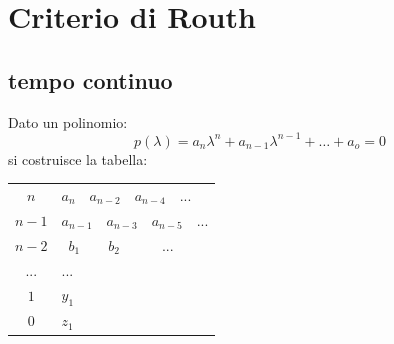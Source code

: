 \documentclass{report}
\theoremstyle{nostyle}
\begin{document}
\section{Criterio di Routh}
\subsection*{tempo continuo}
Dato un polinomio:
$$p(\lambda) = a_n\lambda^n + a_{n-1} \lambda^{n-1}+\dots+a_o = 0$$
si costruisce la tabella:\bigskip\\



\begin{minipage}{0.38\textwidth}
            \begin{center}
                \begin{tabular}{c|l}
                     
                     $n$ & $a_{n} \quad a_{n-2} \quad a_{n-4} \quad ...$ \\
                     $n-1$ & $a_{n-1} \quad a_{n-3} \quad a_{n-5} \quad ...$ \\
                     $n-2$ & \ $b_{1} \quad \quad b_{2} \quad \qquad  ...$ \\
                     $...$ & $...$ \\
                     $1$ & $y_{1}$ \\ 
                     $0$ & $z_{1}$ \\
                     \hline
                \end{tabular}
            \end{center}
            \end{minipage}
            \hfill
\end{document}
